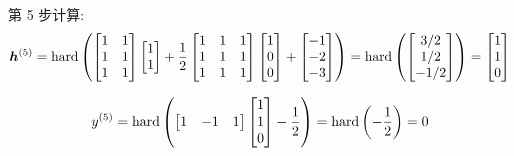 \documentclass{article}
\begin{document}
第 5 步计算:
\begin{equation}
  \bm{h}^{(5)}
  =\operatorname{hard}\left(
    \begin{bmatrix}
      1 & 1 \\
      1 & 1 \\
      1 & 1 \\
    \end{bmatrix}
    \begin{bmatrix}
      1 \\ 1 \\
    \end{bmatrix}
    +\frac{1}{2}
    \begin{bmatrix}
      1 & 1 & 1 \\
      1 & 1 & 1 \\
      1 & 1 & 1 \\
    \end{bmatrix}
    \begin{bmatrix}
      1 \\ 0 \\ 0 \\
    \end{bmatrix}
    +
    \begin{bmatrix}
      -1 \\ -2 \\ -3 \\
    \end{bmatrix}
  \right)
  =\operatorname{hard}\left(
    \begin{bmatrix}
      3/2 \\ 1/2 \\ -1/2 \\
    \end{bmatrix}
  \right)
  =
  \begin{bmatrix}
    1 \\ 1 \\ 0 \\
  \end{bmatrix}
\end{equation}

\begin{equation}
  y^{(5)}
  =\operatorname{hard}\left(
    \begin{bmatrix}
      1 & -1 & 1 \\
    \end{bmatrix}
    \begin{bmatrix}
      1 \\ 1 \\ 0 \\
    \end{bmatrix}
    -\frac{1}{2}
  \right)
  =\operatorname{hard}\left(
    -\frac{1}{2}
  \right)
  =0
\end{equation}
\end{document}
